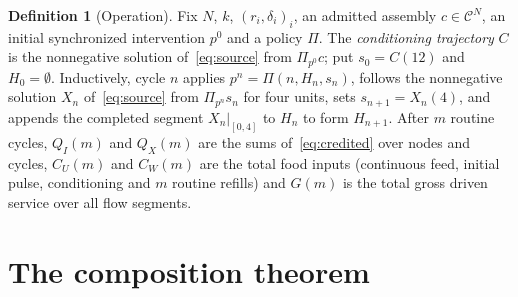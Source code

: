 \documentclass[11pt,a4paper]{article}
\theoremstyle{plain}
\theoremstyle{definition}
\newtheorem{definition}[theorem]{Definition}
\theoremstyle{remark}
\newcommand{\Adm}{\mathcal C}
\newcommand{\Pulse}{\Pi}
\newcommand{\Iv}{I}
\begin{document}
\begin{definition}[Operation]\label{def:operation}
Fix $N$, $k$, $(r_i,\delta_i)_i$, an admitted assembly $c\in\Adm^N$, an initial synchronized intervention $p^0$ and a policy $\Pi$. The \emph{conditioning trajectory} $C$ is the nonnegative solution of~\eqref{eq:source} from $\Pulse_{p^0}c$; put $s_0=C(12)$ and $H_0=\emptyset$. Inductively, cycle $n$ applies $p^n=\Pi(n,H_n,s_n)$, follows the nonnegative solution $X_n$ of~\eqref{eq:source} from $\Pulse_{p^n}s_n$ for four units, sets $s_{n+1}=X_n(4)$, and appends the completed segment $X_n|_{[0,4]}$ to $H_n$ to form $H_{n+1}$. After $m$ routine cycles, $Q_\Iv(m)$ and $Q_X(m)$ are the sums of~\eqref{eq:credited} over nodes and cycles, $C_U(m)$ and $C_W(m)$ are the total food inputs (continuous feed, initial pulse, conditioning and $m$ routine refills) and $G(m)$ is the total gross driven service over all flow segments.
\end{definition}

\section{The composition theorem}\label{sec:main}
\end{document}
